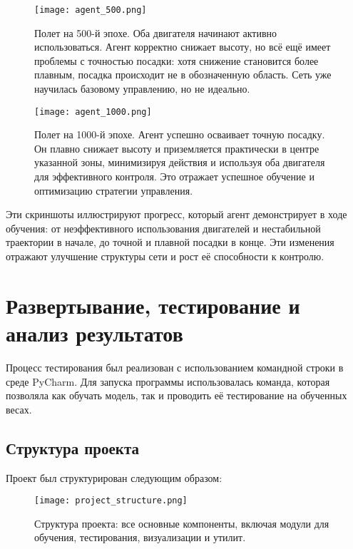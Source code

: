 \documentclass[a4paper,12pt]{article}
\begin{document}
\begin{figure}[H]
	\centering
	\texttt{[image: agent\_500.png]}
	\caption{Полет на 500-й эпохе. Оба двигателя начинают активно использоваться. Агент корректно снижает высоту, но всё ещё имеет проблемы с точностью посадки: хотя снижение становится более плавным, посадка происходит не в обозначенную область. Сеть уже научилась базовому управлению, но не идеально.}
	\label{fig:landing_epoch500}
\end{figure}

\begin{figure}[H]
	\centering
	\texttt{[image: agent\_1000.png]}
	\caption{Полет на 1000-й эпохе. Агент успешно осваивает точную посадку. Он плавно снижает высоту и приземляется практически в центре указанной зоны, минимизируя действия и используя оба двигателя для эффективного контроля. Это отражает успешное обучение и оптимизацию стратегии управления.}
	\label{fig:landing_epoch1000}
\end{figure}

Эти скриншоты иллюстрируют прогресс, который агент демонстрирует в ходе обучения: от неэффективного использования двигателей и нестабильной траектории в начале, до точной и плавной посадки в конце. Эти изменения отражают улучшение структуры сети и рост её способности к контролю.

\section{Развертывание, тестирование и анализ результатов}

Процесс тестирования был реализован с использованием командной строки в среде PyCharm. Для запуска программы использовалась команда, которая позволяла как обучать модель, так и проводить её тестирование на обученных весах.

\subsection{Структура проекта}

Проект был структурирован следующим образом:

\begin{figure}[H]
	\centering
	\texttt{[image: project\_structure.png]}
	\caption{Структура проекта: все основные компоненты, включая модули для обучения, тестирования, визуализации и утилит.}
	\label{fig:project_structure}
\end{figure}
\end{document}
